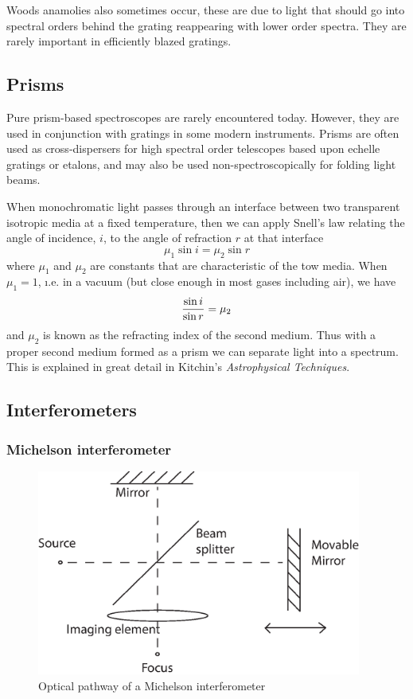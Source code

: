 Woods anamolies also sometimes occur, these are due to light that should go into spectral orders behind the grating reappearing with lower order spectra. They are rarely 
important in efficiently blazed gratings.

\subsection{Prisms}

Pure prism-based spectroscopes are rarely encountered today. However, they are used in 
conjunction with gratings in some modern instruments. Prisms are often used as cross-dispersers for high spectral order telescopes based upon echelle gratings or etalons, and may also be used non-spectroscopically for folding light beams.

When monochromatic light passes through an interface between two transparent isotropic
media at a fixed temperature, then we can apply Snell's law relating the angle of incidence, $i$, to the angle of refraction $r$ at that interface
\[ 
\mu_1\sin i=\mu_2\sin r
\]
where $\mu_1$ and $\mu_2$ are constants that are characteristic of the tow media. 
When $\mu_1=1$, {\i.e.} in a vacuum (but close enough in most gases including air), 
we have
\[
{\sin i\over\sin r}=\mu_2
\]
and $\mu_2$ is known as the refracting index of the second medium. Thus with a proper
second medium formed as a prism we can separate light into a spectrum. This is explained in great detail in Kitchin's {\it Astrophysical Techniques}.

\subsection{Interferometers}

\subsubsection{Michelson interferometer}

\begin{figure}[h]
  \centering
	\includegraphics[width=0.95\textwidth]{michelson-interferometer.eps}
  \caption{Optical pathway of a Michelson interferometer}
  \label{fig:michelson-interferometer}
\end{figure}

